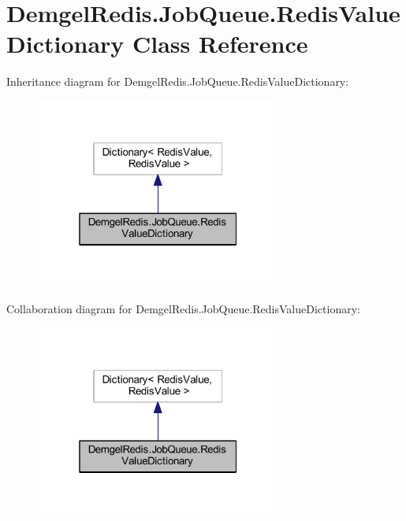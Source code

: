 \hypertarget{class_demgel_redis_1_1_job_queue_1_1_redis_value_dictionary}{}\section{Demgel\+Redis.\+Job\+Queue.\+Redis\+Value\+Dictionary Class Reference}
\label{class_demgel_redis_1_1_job_queue_1_1_redis_value_dictionary}


Inheritance diagram for Demgel\+Redis.\+Job\+Queue.\+Redis\+Value\+Dictionary\+:
\nopagebreak
\begin{figure}[H]
\begin{center}
\leavevmode
\includegraphics[width=229pt]{class_demgel_redis_1_1_job_queue_1_1_redis_value_dictionary__inherit__graph}
\end{center}
\end{figure}


Collaboration diagram for Demgel\+Redis.\+Job\+Queue.\+Redis\+Value\+Dictionary\+:
\nopagebreak
\begin{figure}[H]
\begin{center}
\leavevmode
\includegraphics[width=229pt]{class_demgel_redis_1_1_job_queue_1_1_redis_value_dictionary__coll__graph}
\end{center}
\end{figure}
